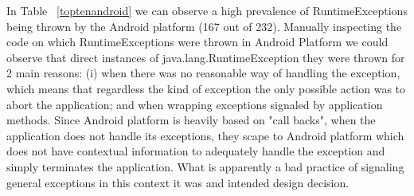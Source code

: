 \documentclass[conference]{IEEEtran}
\begin{document}
In Table ~\ref{toptenandroid} we can observe a high prevalence of RuntimeExceptions being thrown by the Android platform (167 out of 232).  Manually inspecting the code on which RuntimeExceptions were thrown in Android Platform we could observe that direct instances of java.lang.RuntimeException they were thrown for 2 main reasons: (i) when there was no reasonable way of handling the exception, which means that regardless the kind of exception the only possible action was to abort the application; and when wrapping exceptions signaled by application methods. Since Android platform is heavily based on "call backs", when the application does not handle its exceptions, they scape to Android platform which does not have contextual information to adequately handle the exception and simply terminates the application. What is apparently a bad practice of signaling general exceptions in this context it was and intended design decision.







\end{document}
